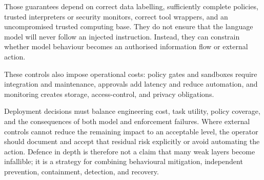Those guarantees depend on correct data labelling, sufficiently complete
policies, trusted interpreters or security monitors, correct tool wrappers, and
an uncompromised trusted computing base. They do not ensure that the language
model will never follow an injected instruction. Instead, they can constrain
whether model behaviour becomes an authorised information flow or external
action.

These controls also impose operational costs: policy gates and sandboxes require
integration and maintenance, approvals add latency and reduce automation, and
monitoring creates storage, access-control, and privacy obligations.

Deployment decisions must balance engineering cost, task utility, policy
coverage, and the consequences of both model and enforcement failures. Where
external controls cannot reduce the remaining impact to an acceptable level,
the operator should document and accept that residual risk explicitly or avoid
automating the action. Defence in depth is therefore not a claim that many weak
layers become infallible; it is a strategy for combining behavioural mitigation,
independent prevention, containment, detection, and recovery.
